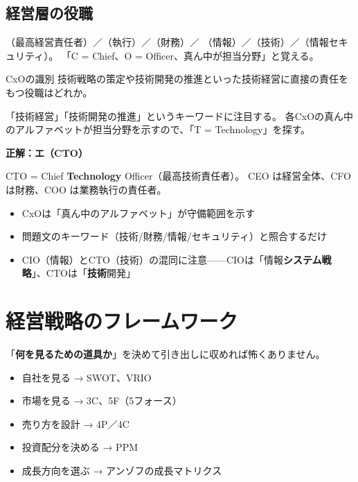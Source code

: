 \subsection{経営層の役職}

\begin{teigi}
（最高経営責任者）／（執行）／（財務）／
（情報）／（技術）／（情報セキュリティ）。
「C = Chief、O = Officer、真ん中が担当分野」と覚える。
\end{teigi}

\begin{reidai}{CxOの識別}
技術戦略の策定や技術開発の推進といった技術経営に直接の責任をもつ役職はどれか。

\end{reidai}

\begin{shishin}
「技術経営」「技術開発の推進」というキーワードに注目する。
各CxOの真ん中のアルファベットが担当分野を示すので、「T = Technology」を探す。
\end{shishin}

\begin{kaitou}
\textbf{正解：エ（CTO）}

CTO = Chief \textbf{Technology} Officer（最高技術責任者）。
CEO は経営全体、CFO は財務、COO は業務執行の責任者。
\end{kaitou}

\begin{minuki}[見抜き方]
\begin{itemize}
  \item CxOは「真ん中のアルファベット」が守備範囲を示す
  \item 問題文のキーワード（技術/財務/情報/セキュリティ）と照合するだけ
  \item CIO（情報）とCTO（技術）の混同に注意——CIOは「情報\textbf{システム戦略}」、CTOは「\textbf{技術}開発」
\end{itemize}
\end{minuki}

\section{経営戦略のフレームワーク}

\begin{pitfall}[横文字フレームワークが多すぎる]
「\textbf{何を見るための道具か}」を決めて引き出しに収めれば怖くありません。
\begin{itemize}
  \item 自社を見る → SWOT、VRIO
  \item 市場を見る → 3C、5F（5フォース）
  \item 売り方を設計 → 4P／4C
  \item 投資配分を決める → PPM
  \item 成長方向を選ぶ → アンゾフの成長マトリクス
\end{itemize}
\end{pitfall}

